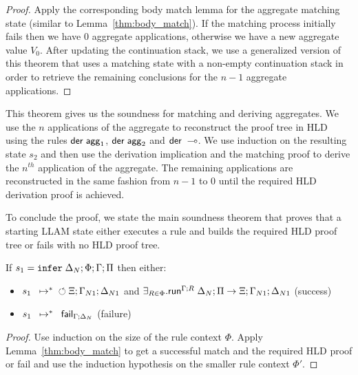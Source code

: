 \begin{proof}
Apply the corresponding body match lemma for the aggregate matching state
(similar to Lemma~\ref{thm:body_match}). If the matching process initially fails then
we have 0 aggregate applications, otherwise we have a new aggregate value $V_0$.
After updating the continuation stack, we use a generalized version of this
theorem that uses a matching state with a non-empty continuation stack
in order to retrieve the remaining conclusions for the $n-1$ aggregate applications.
\end{proof}

This theorem gives us the soundness for matching and deriving aggregates. We
use the $n$ applications of the aggregate to reconstruct the proof tree in HLD
using the rules $\dzname \m{agg}_1$, $\dzname \m{agg}_2$ and $\dzname \lolli$.
We use induction on the resulting state $s_2$ and then use the derivation
implication and the matching proof to derive the $n^{th}$ application of the
aggregate. The remaining applications are reconstructed in the same fashion
from $n-1$ to $0$ until the required HLD derivation proof is achieved.

To conclude the proof, we state the main soundness theorem that proves that a
starting LLAM state either executes a rule and builds the required HLD proof tree
or fails with no HLD proof tree.

\begin{theorem}[Soundness]\label{thm:soundness}
  If $s_1 = \dostate{\Delta_N}{\Phi}{\Gamma}{\Pi}$
  then either:
  
  \begin{itemize}
        \item $\transs{s_1}{\finalstate{\Xi}{\Gamma_{N1}}{\Delta_{N1}}}$
  and $\exists_{R \in \Phi}. \dozx{\Gamma}{\Delta_N}{\Pi}{R}{\Xi; \Gamma_{N1};
        \Delta_{N1}}$ (success)
  \item $\transs{s_1}{\failstate{\Gamma}{\Delta_N}}$ (failure)
     \end{itemize}
\end{theorem}

\begin{proof}
   Use induction on the size of the rule context $\Phi$. Apply Lemma~\ref{thm:body_match} to
   get a successful match and the required HLD proof or fail and use the
   induction hypothesis on the smaller rule context $\Phi'$.
\end{proof}

